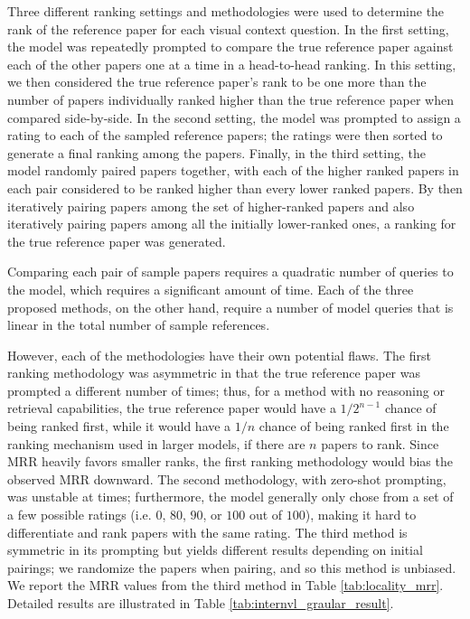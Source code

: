 Three different ranking settings and methodologies were used to determine the rank of the reference paper for each visual context question. In the first setting, the model was repeatedly prompted to compare the true reference paper against each of the other papers one at a time in a head-to-head ranking. In this setting, we then considered the true reference paper's rank to be one more than the number of papers individually ranked higher than the true reference paper when compared side-by-side. In the second setting, the model was prompted to assign a rating to each of the sampled reference papers; the ratings were then sorted to generate a final ranking among the papers. Finally, in the third setting, the model randomly paired papers together, with each of the higher ranked papers in each pair considered to be ranked higher than every lower ranked papers. By then iteratively pairing papers among the set of higher-ranked papers and also iteratively pairing papers among all the initially lower-ranked ones, a ranking for the true reference paper was generated. 

Comparing each pair of sample papers requires a quadratic number of queries to the model, which requires a significant amount of time. Each of the three proposed methods, on the other hand, require a number of model queries that is linear in the total number of sample references. 

However, each of the methodologies have their own potential flaws. The first ranking methodology was asymmetric in that the true reference paper was prompted a different number of times; thus, for a method with no reasoning or retrieval capabilities, the true reference paper would have a $1/2^{n-1}$ chance of being ranked first, while it would have a $1/n$ chance of being ranked first in the ranking mechanism used in larger models, if there are $n$ papers to rank. Since MRR heavily favors smaller ranks, the first ranking methodology would bias the observed MRR downward. The second methodology, with zero-shot prompting, was unstable at times; furthermore, the model generally only chose from a set of a few possible ratings (i.e. $0$, $80$, $90$, or $100$ out of $100$), making it hard to differentiate and rank papers with the same rating. The third method is symmetric in its prompting but yields different results depending on initial pairings; we randomize the papers when pairing, and so this method is unbiased. We report the MRR values from the third method in Table \ref{tab:locality_mrr}. Detailed results are illustrated in Table \ref{tab:internvl_graular_result}. 


